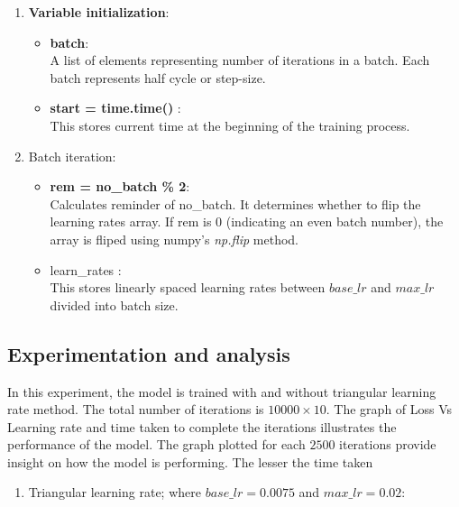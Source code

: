 \begin{enumerate}
    \item \textbf{Variable initialization}: 
    \begin{itemize}
        \item \textbf{batch}: \\ A list of elements representing number of iterations in a batch. Each batch represents half cycle or step-size.
        \item \textbf{start = time.time()} :\\ This stores current time at the beginning of the training process.
    \end{itemize}
    \item Batch iteration: \\
     \begin{itemize}
        \item \textbf{rem = no\_batch \% 2}: \\ Calculates reminder of no\_batch. It determines whether to flip the learning rates array. If rem is 0 (indicating an even batch number), the array is fliped using numpy's \parencite{harris2020array} \textit{np.flip} method.
        \item learn\_rates :\\ This stores linearly spaced learning rates between $base\_lr$ and $max\_lr$ divided into batch size.
    \end{itemize}
    
    
\end{enumerate}


\subsection{Experimentation and analysis}
In this experiment, the model is trained with and without triangular learning rate method. The total number of iterations is $10000 \times 10$. The graph of Loss Vs Learning rate and time taken to complete the iterations illustrates the performance of the model. The graph plotted for each $2500$ iterations provide insight on how the model is performing. The lesser the time taken  
\begin{enumerate}
    \item Triangular learning rate; where $base\_lr =0.0075$ and $max\_lr=0.02$: \\
    
     

   
    
\end{enumerate}
